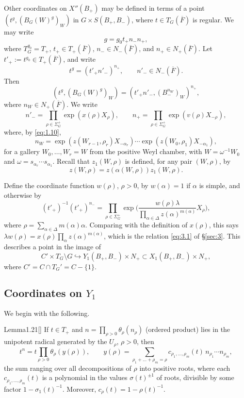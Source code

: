 \documentclass[12pt,letterpaper]{amsart}
\theoremstyle{plain}
\theoremstyle{definition}
\theoremstyle{remark}
\theoremstyle{definition}
\newcommand{\ovF}{\overline{F}}
\begin{document}
Other coordinates on $X''(B_+)$ may be defined in terms of a point
$(t^g,(B_G(W)^g)_{W})$ in
$G\times S(B_+,B_-)$, where $t\in T_G(\ovF )$ is regular. We may write
\[
g=g_0t_+n_-n_+,
\]
where $T_G^{g_0}=T_+$, $t_+\in T_+(\ovF)$, $n_-\in N_-(\ovF)$,
and $n_+\in N_+(\ovF)$. Let $t'_+:=t^{g_0}\in T_+(\ovF)$,
and write
\[
t^g=(t'_+n'_-)^{n_+},\qquad n'_-\in N_-(\ovF).
\]
Then
\[
(t^g,(B_G(W)^g)_{W})=(t'_+n'_-,(B_-^{n_W})_W)^{n_+},
\]
where $n_W\in N_+(\ovF)$. We write
\[
n'_-=\prod_{\rho\in\Sigma_G^+}\exp (x(\rho)X_\rho),\qquad
n_+=\prod_{\rho\in\Sigma_G^+}\exp (v(\rho)X_{-\rho}),
\]
where, by \eqref{eq:1.10},
\begin{equation}\tag{1.18}\label{eq:1.18}
n_W=\exp (z(W_{r-1},\rho_r)X_{-\alpha_r})
\cdots
\exp (z(W_0,\rho_1)X_{-\alpha_1}),
\end{equation}
for a gallery $W_0,\dots,W_r=W$ from the positive Weyl chamber, with
$W=\omega^{-1}W_0$ and $\omega=s_{\alpha_r}\cdots s_{\alpha_1}$.
Recall that $z_1(W,\rho)$ is defined, for any pair $(W,\rho)$, by
\begin{equation}\tag{1.19}\label{eq:1.19}
z(W,\rho)=z(\alpha(W,\rho))z_1(W,\rho).
\end{equation}

Define the coordinate function $w(\rho)$, $\rho >0$, by
$w(\alpha)=1$ if $\alpha$ is simple, and otherwise by
\begin{equation}\tag{1.20}\label{eq:1.20}
(t'_+)^{-1}(t'_+)^{n_-}=
\prod_{\rho\in\Sigma_G^+}
\exp \Big(\frac{w(\rho)\lambda}{\prod_{\alpha\in\Delta}z(\alpha)^{m(\alpha)}}X_\rho\Big),
\end{equation}
where $\rho=\sum_{\alpha\in\Delta}m(\alpha)\alpha$. Comparing with the
definition of $x(\rho)$, this says $\lambda w(\rho)=x(\rho)\prod_\alpha
z(\alpha)^{m(\alpha)}$, which is the relation \eqref{eq:3.1} of
\S\ref{sec:3}. This describes a point in the image of
\[
C'\times T_G\setminus G\hookrightarrow Y_1(B_+,B_-)\times N_+
\subset X_1(B_+,B_-)\times N_+,
\]
where $C'=C\cap T_G'=C-\{1\}$.

\subsection*{Coordinates on \texorpdfstring{$Y_1$}{Y1}}

We begin with the following.

\begin{res}{Lemma}{1.21}[{\cite[Ch.~II, Lemma~3.3]{Ha92a}}]\label{res:1.21}
If $t\in T_+$ and
$n=\prod_{\rho >0}\theta_\rho(n_\rho)$ (ordered product) lies in the
unipotent radical generated by the $U_\rho$, $\rho>0$, then
\[
t^n=t\prod_{\rho >0}\theta_\rho(y(\rho)),\qquad
y(\rho)=\sum_{\rho_1+\dots+\rho_m=\rho} c_{\rho_1,\dots,\rho_m}(t)\,
n_{\rho_1}\cdots n_{\rho_m},
\]
the sum ranging over all decompositions of $\rho$ into positive roots, where
each $c_{\rho_1,\dots,\rho_m}(t)$ is a polynomial in the values $\sigma(t)^{\pm1}$
of roots, divisible by some factor $1-\sigma_1(t)^{-1}$.
Moreover, $c_\rho(t)=1-\rho(t)^{-1}$.
\end{res}
\end{document}
